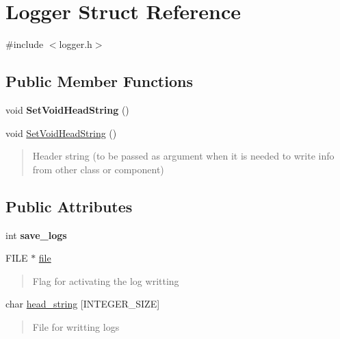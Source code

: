 \hypertarget{structLogger}{}\section{Logger Struct Reference}
\label{structLogger}


{\ttfamily \#include $<$logger.\+h$>$}

\subsection*{Public Member Functions}
\begin{DoxyCompactItemize}
\item 
\mbox{\label{structLogger_a31e093f2753510cacc169d8169221f01}} 
void {\bfseries Set\+Void\+Head\+String} ()
\item 
void \hyperlink{structLogger_a31e093f2753510cacc169d8169221f01}{Set\+Void\+Head\+String} ()
\begin{DoxyCompactList}\small\item\em \begin{quote}
Header string (to be passed as argument when it is needed to write info from other class or component) \end{quote}
\end{DoxyCompactList}\end{DoxyCompactItemize}
\subsection*{Public Attributes}
\begin{DoxyCompactItemize}
\item 
\mbox{\label{structLogger_a393d591ff9848c9ecdf78c2281437268}} 
int {\bfseries save\+\_\+logs}
\item 
\mbox{\label{structLogger_a128ce99d1539f618d3b41a46b8c18619}} 
F\+I\+LE $\ast$ \hyperlink{structLogger_a128ce99d1539f618d3b41a46b8c18619}{file}
\begin{DoxyCompactList}\small\item\em \begin{quote}
Flag for activating the log writting \end{quote}
\end{DoxyCompactList}\item 
\mbox{\label{structLogger_af496e4e5bb7cf4e79ea9f725d627780c}} 
char \hyperlink{structLogger_af496e4e5bb7cf4e79ea9f725d627780c}{head\+\_\+string} \mbox{[}I\+N\+T\+E\+G\+E\+R\+\_\+\+S\+I\+ZE\mbox{]}
\begin{DoxyCompactList}\small\item\em \begin{quote}
File for writting logs \end{quote}
\end{DoxyCompactList}\end{DoxyCompactItemize}


